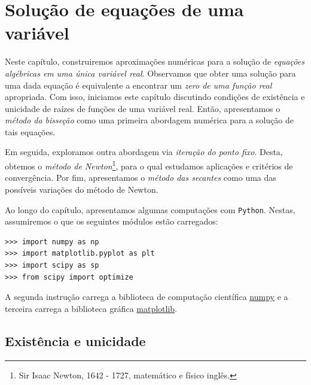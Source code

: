 %

\chapter{Solução de equações de uma variável}\label{cap:equacao1d}

Neste capítulo, construiremos aproximações numéricas para a solução de \emph{equações algébricas em uma única variável real}. Observamos que obter uma solução para uma dada equação é equivalente a encontrar um \emph{zero de uma função real} apropriada. Com isso, iniciamos este capítulo discutindo condições de existência e unicidade de raízes de funções de uma variável real. Então, apresentamos o \emph{método da bisseção} como uma primeira abordagem numérica para a solução de tais equações.

Em seguida, exploramos outra abordagem via \emph{iteração do ponto fixo}. Desta, obtemos o \emph{método de Newton}\footnote{Sir Isaac Newton, 1642 - 1727, matemático e físico inglês.}, para o qual estudamos aplicações e critérios de convergência. Por fim, apresentamos o \emph{método das secantes} como uma das possíveis variações do método de Newton.

\ifispython
Ao longo do capítulo, apresentamos algumas computações com \verb+Python+. Nestas, assumiremos o que os seguintes módulos estão carregados:
\begin{verbatim}
>>> import numpy as np
>>> import matplotlib.pyplot as plt
>>> import scipy as sp
>>> from scipy import optimize
\end{verbatim}
A segunda instrução carrega a biblioteca de computação científica \href{http://www.numpy.org/}{numpy} e a terceira carrega a biblioteca gráfica \href{https://matplotlib.org/}{matplotlib}.
\fi

\section{Existência e unicidade}

